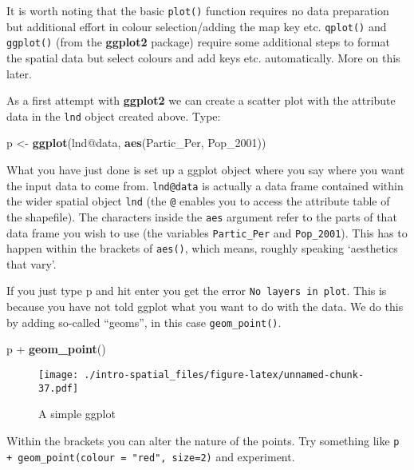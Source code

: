 \documentclass[]{article}
\newenvironment{Shaded}{}{}
\newcommand{\KeywordTok}[1]{\textcolor[rgb]{0.00,0.44,0.13}{\textbf{{#1}}}}
\newcommand{\StringTok}[1]{\textcolor[rgb]{0.25,0.44,0.63}{{#1}}}
\newcommand{\NormalTok}[1]{{#1}}
\begin{document}
It is worth noting that the basic \texttt{plot()} function requires no
data preparation but additional effort in colour selection/adding the
map key etc. \texttt{qplot()} and \texttt{ggplot()} (from the
\textbf{ggplot2} package) require some additional steps to format the
spatial data but select colours and add keys etc. automatically. More on
this later.

As a first attempt with \textbf{ggplot2} we can create a scatter plot
with the attribute data in the \texttt{lnd} object created above. Type:

\begin{Shaded}
\begin{Highlighting}[]
\NormalTok{p <-}\StringTok{ }\KeywordTok{ggplot}\NormalTok{(lnd@data, }\KeywordTok{aes}\NormalTok{(Partic_Per, Pop_2001))}
\end{Highlighting}
\end{Shaded}

What you have just done is set up a ggplot object where you say where
you want the input data to come from. \texttt{lnd@data} is actually a
data frame contained within the wider spatial object \texttt{lnd} (the
\texttt{@} enables you to access the attribute table of the shapefile).
The characters inside the \texttt{aes} argument refer to the parts of
that data frame you wish to use (the variables \texttt{Partic\_Per} and
\texttt{Pop\_2001}). This has to happen within the brackets of
\texttt{aes()}, which means, roughly speaking `aesthetics that vary'.

If you just type p and hit enter you get the error
\texttt{No layers in plot}. This is because you have not told ggplot
what you want to do with the data. We do this by adding so-called
``geoms'', in this case \texttt{geom\_point()}.

\begin{Shaded}
\begin{Highlighting}[]
\NormalTok{p +}\StringTok{ }\KeywordTok{geom_point}\NormalTok{()}
\end{Highlighting}
\end{Shaded}

\begin{figure}[htbp]
\centering
\texttt{[image: ./intro-spatial\_files/figure-latex/unnamed-chunk-37.pdf]}
\caption{A simple ggplot}
\end{figure}

Within the brackets you can alter the nature of the points. Try
something like \texttt{p + geom\_point(colour = "red", size=2)} and
experiment.
\end{document}
